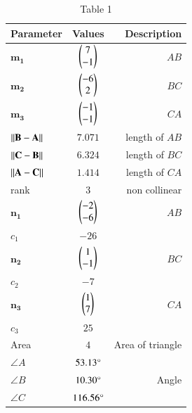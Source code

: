 \documentclass[journal,12pt,twocolumn]{IEEEtran}
\theoremstyle{remark}
\begin{document}
\let\vec\mathbf
\begin{table}[h!]
 \begin{center}
  \caption{Table 1}
  \label{tab: table1}
\begin{tabular}{|l|c|r|}
    \hline
    Parameter & Values & Description\\
    \hline
     $\vec{m_1}$ & $\begin{pmatrix}7\\-1\\\end{pmatrix}$ & $AB$\\
     $\vec{m_2}$ & $\begin{pmatrix}-6\\2\\\end{pmatrix}$ & $BC$\\
     $\vec{m_3}$ & $\begin{pmatrix}-1\\-1\\\end{pmatrix}$ & $CA$\\
    \hline
    $\norm{\vec{B}-\vec{A}}$ & $7.071$ & length of $AB$\\
    $\norm{\vec{C}-\vec{B}}$ & $6.324$ & length of $BC$\\
    $\norm{\vec{A}-\vec{C}}$ & $1.414$ & length of $CA$\\
    \hline
    rank & 3 & non collinear\\
    \hline
    $\vec{n_1}$ & $\begin{pmatrix}-2\\-6\\\end{pmatrix}$ & $AB$\\
    ${c_1}$ & $-26$ & {}\\
    $\vec{n_2}$ & $\begin{pmatrix}1\\-1\\\end{pmatrix}$ & $BC$\\
    ${c_2}$ & $-7$ & {}\\
    $\vec{n_3}$ & $\begin{pmatrix}1\\7\\\end{pmatrix}$ & $CA$\\
    ${c_3}$ & $25$ & {}\\
    \hline
    Area & $4$ & Area of triangle\\
    \hline
    $\angle A$ & $53.13\degree$ & {}\\
    $\angle B$ & $10.30\degree$ & Angle\\
    $\angle C$ & $116.56\degree$ & {}\\
    \hline
\end{tabular}
\end{center}
\end{table}
\end{document}
